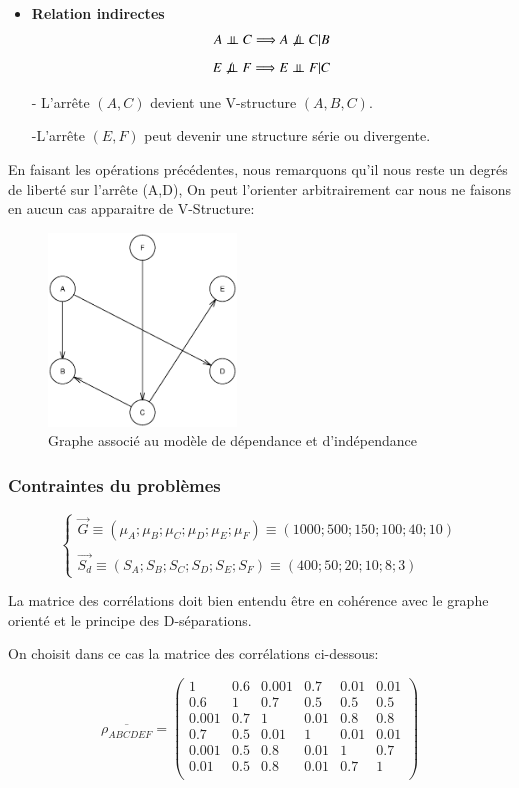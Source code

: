 \documentclass[a4paper]{article}
\begin{document}
\begin{appendices}
\begin{itemize}
\item \textbf{Relation indirectes}
$$A \perp\!\!\!\perp C \Longrightarrow A\not\perp\!\!\!\perp C |B  $$
$$  E\not\perp\!\!\!\perp F\Longrightarrow E\perp\!\!\!\perp F|C$$

- L'arrête $(A,C)$ devient une V-structure $(A,B,C)$.

-L'arrête $(E,F)$ peut devenir une structure série ou divergente.
\end{itemize}

En faisant les opérations précédentes, nous remarquons  qu'il nous reste un degrés de liberté sur l'arrête (A,D), On peut l'orienter arbitrairement car nous ne faisons en aucun cas apparaitre de V-Structure:

\begin{figure}[H] 
    \center 
    \includegraphics[width=5cm]{GRAPHE_BAYesien_EX2.eps} 
    \caption{Graphe associé au modèle de dépendance et d'indépendance } 
\end{figure} 

 \subsubsection{Contraintes du problèmes}

\[
\left\lbrace 
\begin{array}{lcl}
\vec{G}\equiv(\mu_{A}; \mu_{B}; \mu_{C}; \mu_{D}; \mu_{E}; \mu_{F})\equiv(1000; 500 ; 150; 100 ; 40 ;10)\\ \\
\vec{S_{d}}\equiv(S_{A}; S_{B}; S_{C} ; S_{D}; S_{E}; S_{F})\equiv(400;50;20;10;8;3)
\end{array}\right.
\]


La matrice des corrélations doit bien entendu être en cohérence avec le graphe orienté et le principe des D-séparations.

On choisit dans ce cas la matrice des corrélations ci-dessous:


$$\overline{\rho_{ABCDEF}}=\begin{pmatrix}
1&0.6&0.001&0.7&0.01&0.01\\
0.6&1&0.7&0.5&0.5&0.5\\
0.001&0.7&1&0.01&0.8&0.8\\
0.7&0.5&0.01&1&0.01&0.01\\
0.001&0.5&0.8&0.01&1&0.7\\
0.01&0.5&0.8&0.01&0.7&1\\
\end{pmatrix}$$


\end{appendices}
\end{document}
